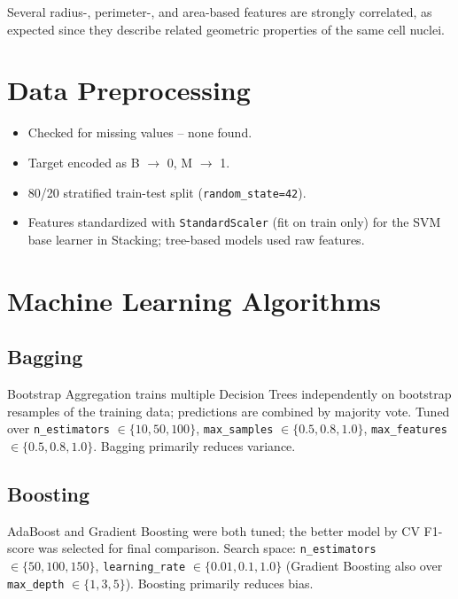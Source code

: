 \documentclass[11pt,a4paper]{article}
\begin{document}
Several radius-, perimeter-, and area-based features are strongly correlated, as expected since they
describe related geometric properties of the same cell nuclei.

\section{Data Preprocessing}
\begin{itemize}[nosep]
    \item Checked for missing values -- none found.
    \item Target encoded as B $\rightarrow$ 0, M $\rightarrow$ 1.
    \item 80/20 stratified train-test split (\texttt{random\_state=42}).
    \item Features standardized with \texttt{StandardScaler} (fit on train only) for the SVM base learner in Stacking; tree-based models used raw features.
\end{itemize}

\section{Machine Learning Algorithms}

\subsection{Bagging}
Bootstrap Aggregation trains multiple Decision Trees independently on bootstrap resamples of the
training data; predictions are combined by majority vote. Tuned over
\texttt{n\_estimators} $\in\{10,50,100\}$, \texttt{max\_samples} $\in\{0.5,0.8,1.0\}$,
\texttt{max\_features} $\in\{0.5,0.8,1.0\}$. Bagging primarily reduces variance.

\subsection{Boosting}
AdaBoost and Gradient Boosting were both tuned; the better model by CV F1-score was selected for
final comparison. Search space: \texttt{n\_estimators} $\in\{50,100,150\}$,
\texttt{learning\_rate} $\in\{0.01,0.1,1.0\}$ (Gradient Boosting also over \texttt{max\_depth}
$\in\{1,3,5\}$). Boosting primarily reduces bias.
\end{document}
